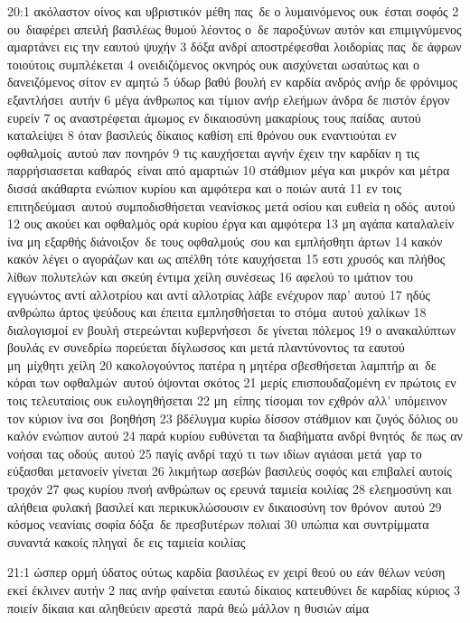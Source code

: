 \documentclass[10pt,oneside,footinclude=true,headinclude=true]{scrbook} %
\begin{document}
20:1 ακόλαστον οίνος και υβριστικόν μέθη πας δε ο λυμαινόμενος ουκ έσται σοφός
2 ου διαφέρει απειλή βασιλέως θυμού λέοντος ο δε παροξύνων αυτόν και επιμιγνύμενος αμαρτάνει εις την εαυτού ψυχήν
3 δόξα ανδρί αποστρέφεσθαι λοιδορίας πας δε άφρων τοιούτοις συμπλέκεται
4 ονειδιζόμενος οκνηρός ουκ αισχύνεται ωσαύτως και ο δανειζόμενος σίτον εν αμητώ
5 ύδωρ βαθύ βουλή εν καρδία ανδρός ανήρ δε φρόνιμος εξαντλήσει αυτήν
6 μέγα άνθρωπος και τίμιον ανήρ ελεήμων άνδρα δε πιστόν έργον ευρείν
7 ος αναστρέφεται άμωμος εν δικαιοσύνη μακαρίους τους παίδας αυτού καταλείψει
8 όταν βασιλεύς δίκαιος καθίση επί θρόνου ουκ εναντιούται εν οφθαλμοίς αυτού παν πονηρόν
9 τις καυχήσεται αγνήν έχειν την καρδίαν η τις παρρήσιασεται καθαρός είναι από αμαρτιών
10 στάθμιον μέγα και μικρόν και μέτρα δισσά ακάθαρτα ενώπιον κυρίου και αμφότερα και ο ποιών αυτά
11 εν τοις επιτηδεύμασι αυτού συμποδισθήσεται νεανίσκος μετά οσίου και ευθεία η οδός αυτού
12 ους ακούει και οφθαλμός ορά κυρίου έργα και αμφότερα
13 μη αγάπα καταλαλείν ίνα μη εξαρθής διάνοιξον δε τους οφθαλμούς σου και εμπλήσθητι άρτων
14 κακόν κακόν λέγει ο αγοράζων και ως απέλθη τότε καυχήσεται
15 εστι χρυσός και πλήθος λίθων πολυτελών και σκεύη έντιμα χείλη συνέσεως
16 αφελού το ιμάτιον του εγγυώντος αντί αλλοτρίου και αντί αλλοτρίας λάβε ενέχυρον παρ' αυτού
17 ηδύς ανθρώπω άρτος ψεύδους και έπειτα εμπλησθήσεται το στόμα αυτού χαλίκων
18 διαλογισμοί εν βουλή στερεώνται κυβερνήσεσι δε γίνεται πόλεμος
19 ο ανακαλύπτων βουλάς εν συνεδρίω πορεύεται δίγλωσσος και μετά πλαντύνοντος τα εαυτού μη μίχθητι χείλη
20 κακολογούντος πατέρα η μητέρα σβεσθήσεται λαμπτήρ αι δε κόραι των οφθαλμών αυτού όψονται σκότος
21 μερίς επισπουδαζομένη εν πρώτοις εν τοις τελευταίοις ουκ ευλογηθήσεται
22 μη είπης τίσομαι τον εχθρόν αλλ' υπόμεινον τον κύριον ίνα σοι βοηθήση
23 βδέλυγμα κυρίω δίσσον στάθμιον και ζυγός δόλιος ου καλόν ενώπιον αυτού
24 παρά κυρίου ευθύνεται τα διαβήματα ανδρί θνητός δε πως αν νοήσαι τας οδούς αυτού
25 παγίς ανδρί ταχύ τι των ιδίων αγιάσαι μετά γαρ το εύξασθαι μετανοείν γίνεται
26 λικμήτωρ ασεβών βασιλεύς σοφός και επιβαλεί αυτοίς τροχόν
27 φως κυρίου πνοή ανθρώπων ος ερευνά ταμιεία κοιλίας
28 ελεημοσύνη και αλήθεια φυλακή βασιλεί και περικυκλώσουσιν εν δικαιοσύνη τον θρόνον αυτού
29 κόσμος νεανίαις σοφία δόξα δε πρεσβυτέρων πολιαί
30 υπώπια και συντρίμματα συναντά κακοίς πληγαί δε εις ταμιεία κοιλίας
\par
21:1 ώσπερ ορμή ύδατος ούτως καρδία βασιλέως εν χειρί θεού ου εάν θέλων νεύση εκεί έκλινεν αυτήν
2 πας ανήρ φαίνεται εαυτώ δίκαιος κατευθύνει δε καρδίας κύριος
3 ποιείν δίκαια και αληθεύειν αρεστά παρά θεώ μάλλον η θυσιών αίμα
\end{document}

